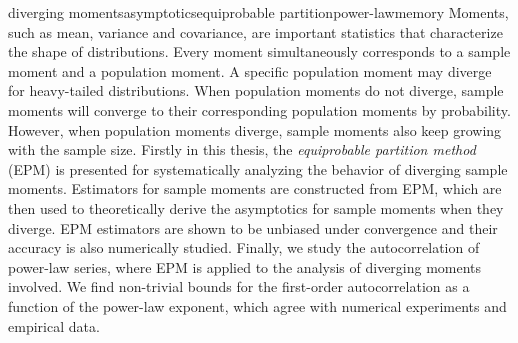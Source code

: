 \begin{Eabstract}{diverging moments}{asymptotics}{equiprobable partition}{power-law}{memory}
Moments, such as mean, variance and covariance, are important statistics that characterize the shape of distributions. Every moment simultaneously corresponds to a sample moment and a population moment. A specific population moment may diverge for heavy-tailed distributions. When population moments do not diverge, sample moments will converge to their corresponding population moments by probability. However, when population moments diverge, sample moments also keep growing with the sample size. Firstly in this thesis, the \textit{equiprobable partition method} (EPM) is presented for systematically analyzing the behavior of diverging sample moments. Estimators for sample moments are constructed from EPM, which are then used to theoretically derive the asymptotics for sample moments when they diverge. EPM estimators are shown to be unbiased under convergence and their accuracy is also numerically studied. Finally, we study the autocorrelation of power-law series, where EPM is applied to the analysis of diverging moments involved. We find non-trivial bounds for the first-order autocorrelation as a function of the power-law exponent, which agree with numerical experiments and empirical data.
\end{Eabstract}
\setcounter{page}{2}
